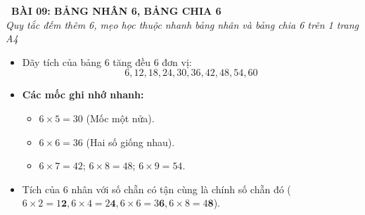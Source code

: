 \documentclass[12pt,a4paper]{article}
\begin{document}
\begin{tcolorbox}[
  enhanced,
  colback=teal!8!white,
  colframe=teal!70!black,
  arc=3mm, boxrule=1.2pt,
  left=3mm, right=3mm, top=2mm, bottom=2mm,
  halign=center
]
  {\LARGE\bfseries\color{teal!90!black}\faBookmark\ BÀI 09: BẢNG NHÂN 6, BẢNG CHIA 6}\\[1mm]
  {\itshape\footnotesize\color{black!75} Quy tắc đếm thêm 6, mẹo học thuộc nhanh bảng nhân và bảng chia 6 trên 1 trang A4}
\end{tcolorbox}

\vspace{-2mm}

\noindent
\begin{minipage}[t]{0.49\textwidth}\vspace{0pt}
\begin{tcolorbox}[
  enhanced,
  colback=blue!4!white,
  colframe=blue!75!black,
  arc=2mm, boxrule=0.8pt,
  left=2mm, right=2mm, top=1.8mm, bottom=1.8mm,
  title={\footnotesize\bfseries\color{white}\faTimes\ 1. Bảng nhân 6 (Đếm thêm 6)}
]
{\footnotesize
\begin{itemize}\setlength{\itemsep}{0.6pt}\setlength{\leftskip}{-2.5mm}
  \item Dãy tích của bảng 6 tăng đều 6 đơn vị:
  $$6, 12, 18, 24, 30, 36, 42, 48, 54, 60$$
  \item \textbf{Các mốc ghi nhớ nhanh:}
  \begin{itemize}\setlength{\itemsep}{0.5pt}\setlength{\leftskip}{-2.5mm}
    \item $6 \times 5 = 30$ (Mốc một nửa).
    \item $6 \times 6 = 36$ (Hai số giống nhau).
    \item $6 \times 7 = 42$; $6 \times 8 = 48$; $6 \times 9 = 54$.
  \end{itemize}
  \item Tích của 6 nhân với số chẵn có tận cùng là chính số chẵn đó ($6 \times 2 = 1\mathbf{2}, 6 \times 4 = 2\mathbf{4}, 6 \times 6 = 3\mathbf{6}, 6 \times 8 = 4\mathbf{8}$).
\end{itemize}
}
\end{tcolorbox}
\end{minipage}
\hfill
\end{document}
